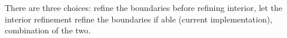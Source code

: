 There are three choices: refine the boundaries before refining interior, let the interior refinement refine the boundaries if able (current implementation), combination of the two.
